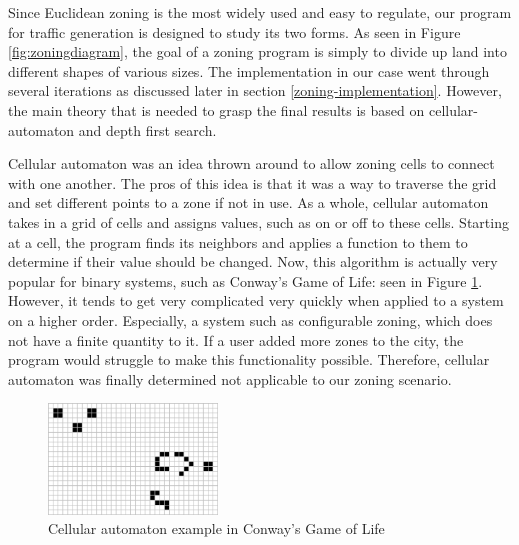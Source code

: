 \documentclass[11pt]{article}
\begin{document}
\begin{multicols}{2}
    \quad Since Euclidean zoning is the most widely used and easy to regulate, our program for traffic generation is designed to study its two forms. As seen in Figure \ref{fig:zoningdiagram}, the goal of a zoning program is simply to divide up land into different shapes of various sizes. The implementation in our case went through several iterations as discussed later in section \ref{zoning-implementation}. However, the main theory that is needed to grasp the final results is based on cellular-automaton and depth first search. 

    \quad Cellular automaton was an idea thrown around to allow zoning cells to connect with one another. The pros of this idea is that it was a way to traverse the grid and set different points to a zone if not in use. As a whole, cellular automaton takes in a grid of cells and assigns values, such as on or off to these cells. Starting at a cell, the program finds its neighbors and applies a function to them to determine if their value should be changed. Now, this algorithm is actually very popular for binary systems, such as Conway's Game of Life: seen in Figure \ref{fig:cellular-automaton}. However, it tends to get very complicated very quickly when applied to a system on a higher order. Especially, a system such as configurable zoning, which does not have a finite quantity to it. If a user added more zones to the city, the program would struggle to make this functionality possible. Therefore, cellular automaton was finally determined not applicable to our zoning scenario.\\

    \begin{figure}[H]
        \centering
        \includegraphics[width=0.4\textwidth]{images/cellularautomaton.png}
        \caption{Cellular automaton example in Conway's Game of Life \cite{cellularautomaton}}
        \label{fig:cellular-automaton}
    \end{figure}


\end{multicols}
\end{document}
